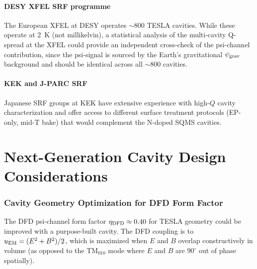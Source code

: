 \documentclass[11pt]{article}
\theoremstyle{definition}
\theoremstyle{remark}
\begin{document}
\subsection{DESY XFEL SRF programme}

The European XFEL at DESY operates $\sim$800 TESLA cavities. While
these operate at 2~K (not millikelvin), a statistical analysis of
the multi-cavity Q-spread at the XFEL could provide an independent
cross-check of the psi-channel contribution, since the psi-signal
is sourced by the Earth's gravitational $\psi_{\rm grav}$ background
and should be identical across all $\sim$800 cavities.

\subsection{KEK and J-PARC SRF}

Japanese SRF groups at KEK have extensive experience with high-$Q$
cavity characterization and offer access to different surface
treatment protocols (EP-only, mid-T bake) that would complement
the N-doped SQMS cavities.


\part{Next-Generation Cavity Design Considerations}
\label{part:nextgen}


\section{Cavity Geometry Optimization for DFD Form Factor}
\label{sec:geometry_opt}

The DFD psi-channel form factor $\eta_{\rm DFD} \approx 0.40$ for
TESLA geometry could be improved with a purpose-built cavity.
The DFD coupling is to $u_{\rm EM} = (E^2 + B^2)/2$, which is
maximized when $E$ and $B$ overlap constructively in volume
(as opposed to the TM$_{010}$ mode where $E$ and $B$ are
$90^\circ$ out of phase spatially).
\end{document}
